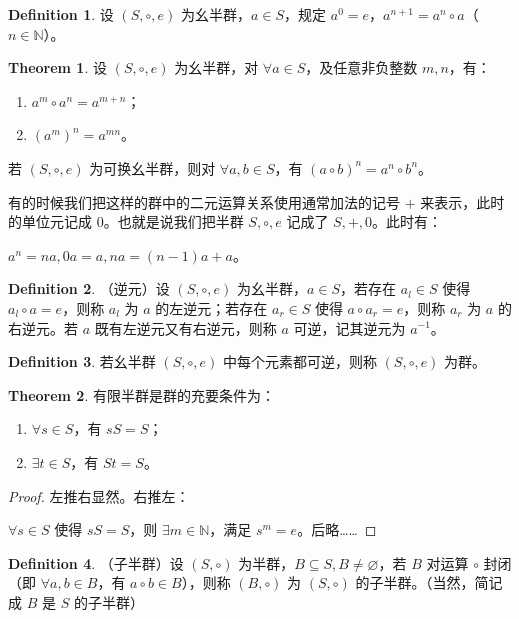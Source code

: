 \documentclass[oneside]{book}
\theoremstyle{definition}
\newtheorem{definition}{Definition}[section]
\newtheorem{theorem}{Theorem}[section]
\begin{document}
\begin{definition}
	设 \( (S, \circ, e) \) 为幺半群，\( a \in S \)，规定 \( a^0 = e \)，\( a^{n+1} = a^n \circ a \)（\( n \in \mathbb{N} \)）。
\end{definition}

\begin{theorem}
	设 \( (S, \circ, e) \) 为幺半群，对 \( \forall a \in S \)，及任意非负整数 \( m, n \)，有：
	\begin{enumerate}
		\item \( a^m \circ a^n = a^{m+n} \)；
		\item \( (a^m)^n = a^{mn} \)。
	\end{enumerate}
	若 \( (S, \circ, e) \) 为可换幺半群，则对 \( \forall a, b \in S \)，有 \( (a \circ b)^n = a^n \circ b^n \)。
\end{theorem}

有的时候我们把这样的群中的二元运算关系使用通常加法的记号 \(+\) 来表示，此时的单位元记成 \(0\)。也就是说我们把半群 \(S,\circ,e\) 记成了 \(S,+,0\)。此时有：

\(a^n=na,0a=a,na=(n-1)a+a\)。
\begin{definition}
	（逆元）设 \( (S, \circ, e) \) 为幺半群，\( a \in S \)，若存在 \( a_l \in S \) 使得 \( a_l \circ a = e \)，则称 \( a_l \) 为 \( a \) 的左逆元；若存在 \( a_r \in S \) 使得 \( a \circ a_r = e \)，则称 \( a_r \) 为 \( a \) 的右逆元。若 \( a \) 既有左逆元又有右逆元，则称 \( a \) 可逆，记其逆元为 \( a^{-1} \)。
\end{definition}

\begin{definition}
	若幺半群 \( (S, \circ, e) \) 中每个元素都可逆，则称 \( (S, \circ, e) \) 为群。
\end{definition}

\begin{theorem}
	有限半群是群的充要条件为：
	\begin{enumerate}
		\item \( \forall s \in S \)，有 \( sS = S \)；
		\item \( \exists t \in S \)，有 \( St = S \)。
	\end{enumerate}
	
\end{theorem}
\begin{proof}
	左推右显然。右推左：
	
	\( \forall s \in S \) 使得 \( sS = S \)，则 \( \exists m \in \mathbb{N} \)，满足 \( s^m = e \)。后略……
\end{proof}
\begin{definition}
	（子半群）设 \( (S, \circ) \) 为半群，\( B \subseteq S ,B\neq \varnothing\)，若 \( B \) 对运算 \( \circ \) 封闭（即 \( \forall a, b \in B \)，有 \( a \circ b \in B \)），则称 \( (B, \circ) \) 为 \( (S, \circ) \) 的子半群。（当然，简记成 \(B\) 是 \(S\) 的子半群）
\end{definition}
\end{document}
